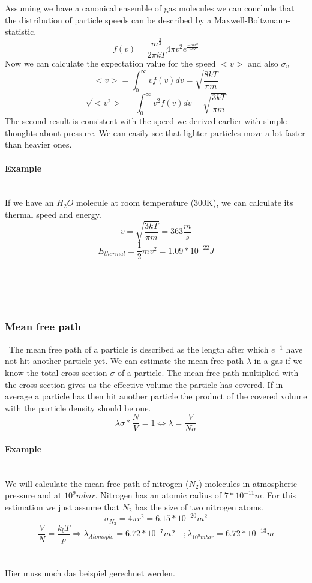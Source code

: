 \documentclass[]{article}
\begin{document}
 Assuming we have a canonical ensemble of gas molecules we can conclude that the distribution of particle speeds can be described by a Maxwell-Boltzmann-statistic. \[ f(v)=\frac{m^{\frac{3}{2}}}{2\pi k T} 4\pi v^{2} e^{\frac{-mv^{2}}{2kT}} \] Now we can calculate the expectation value for the speed $<v>$ and also $\sigma_{v}$
 \[<v>=\int_{0}^{\infty}vf(v)dv=\sqrt{\frac{8kT}{\pi m}}  \]
 \[ \sqrt{<v^{2}>}=\int_{0}^{\infty}v^{2}f(v)dv=\sqrt{\frac{3kT}{\pi m}}  \]
 The second result is consistent with the speed we derived earlier with simple thoughts about pressure. We can easily see that lighter particles move a lot faster than heavier ones. 
 \paragraph{Example}
 \mbox{}\\
 If we have an $H_{2}O$ molecule at room temperature (300K), we can calculate its thermal speed and energy.\[ 
 v=\sqrt{\frac{3kT}{\pi m}}=363\frac{m}{s} \]
 \[ E_{thermal}=\frac{1}{2}mv^{2}=1.09*10^{-22}J \]
\\\\\\\\
\subsubsection{Mean free path}\
The mean free path of a particle is described as the length after which $e^{-1}$ have not hit another particle yet. We can estimate the mean free path $\lambda$ in a gas if we know the total cross section $\sigma$  of a particle. The mean free path multiplied with the cross section gives us the effective volume the particle has covered. If in average a particle has then hit another particle the product of the covered volume with the particle density should be one.\[\lambda \sigma *\frac{N}{V}=1 \Leftrightarrow \lambda=\frac{V}{N\sigma}  \]
\paragraph{Example}\mbox{}\\
We will calculate the mean free path of nitrogen ($N_{2}$) molecules in atmospheric pressure and at $10^{9}mbar$. Nitrogen has an atomic radius of $7*10^{-11}m$. For this estimation we just assume that $N_{2}$ has the size of two nitrogen atoms. \[\sigma_{N_{2}}=4\pi r^{2}=6.15*10^{-20}m^{2} \]\[ \frac{V}{N}=\frac{k_{b}T}{p} \Rightarrow \lambda_{Atomsph.}=6.72*10^{-7}m?   \quad ;\lambda_{10^{9}mbar}=6.72*10^{-13}m \]
\\\\Hier muss noch das beispiel gerechnet werden.
\end{document}
